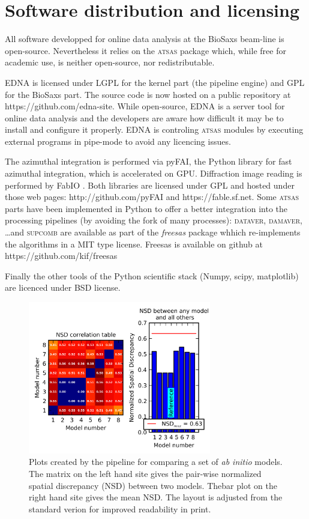 \documentclass[preprint,pdf]{iucr}              %
\begin{document}
\section{Software distribution and licensing}

All software developped for online data analysis at the BioSaxs beam-line is
open-source.
Nevertheless it relies on the \textsc{atsas} package which, while free for
academic use, is neither open-source, nor redistributable.

EDNA is licensed under LGPL for the kernel part (the pipeline engine) and GPL
for the BioSaxs part. The source code is now hosted on a public
repository at https://github.com/edna-site. While open-source, EDNA is a
server tool for online data analysis and the developers are aware how difficult
it may be to install and configure it properly. EDNA is controling
\textsc{atsas} modules by executing external programs in pipe-mode to avoid any
licencing issues.

The azimuthal integration is performed via pyFAI\cite{pyfai}, the Python library
for fast azimuthal integration, which is accelerated on GPU\cite{pyfai_gpu}.
Diffraction image reading is performed by FabIO \cite{fabio}. Both libraries
are licensed under GPL and hosted under those web pages:
http://github.com/pyFAI and https://fable.sf.net.
Some \textsc{atsas} parts have been implemented in Python to offer a better
integration into the processing pipelines (by avoiding the fork of many
processes): \textsc{dataver}, \textsc{damaver}, \ldots  and \textsc{supcomb} are
available as part of the \textit{freesas} package whhich re-implements the
algorithms in a MIT type license. Freesas is available on github at
https://github.com/kif/freesas

Finally the other tools of the Python scientific stack (Numpy, scipy,
matplotlib) are licenced under BSD license.

\begin{figure}
\centering
\includegraphics[width=8cm]{nsd.png}%
\caption{Plots created by the pipeline for comparing a set of \textit{ab initio} models. The matrix on the left hand site gives the pair-wise normalized spatial discrepancy (NSD) between two models. Thebar plot on the right hand site gives the mean NSD. The layout is adjusted from the standard verion for improved readability in print.}
\label{fgr:nsd}
\end{figure}
\end{document}
